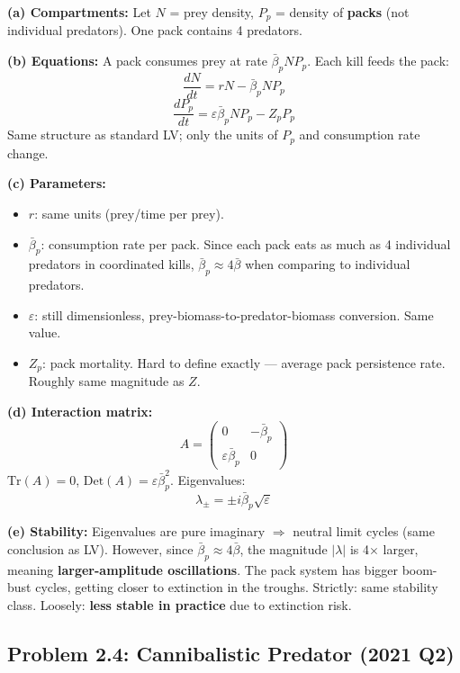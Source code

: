 \documentclass[10pt]{article}
\begin{document}
\begin{solution}
\textbf{(a) Compartments:} Let $N$ = prey density, $P_p$ = density of \textbf{packs} (not individual predators). One pack contains 4 predators.

\textbf{(b) Equations:} A pack consumes prey at rate $\bar\beta_p N P_p$. Each kill feeds the pack:
\[
\frac{dN}{dt} = rN - \bar\beta_p N P_p
\]
\[
\frac{dP_p}{dt} = \varepsilon \bar\beta_p N P_p - Z_p P_p
\]
Same structure as standard LV; only the units of $P_p$ and consumption rate change.

\textbf{(c) Parameters:}
\begin{itemize}
\item $r$: same units (prey/time per prey).
\item $\bar\beta_p$: consumption rate per pack. Since each pack eats as much as 4 individual predators in coordinated kills, $\bar\beta_p \approx 4\bar\beta$ when comparing to individual predators.
\item $\varepsilon$: still dimensionless, prey-biomass-to-predator-biomass conversion. Same value.
\item $Z_p$: pack mortality. Hard to define exactly — average pack persistence rate. Roughly same magnitude as $Z$.
\end{itemize}

\textbf{(d) Interaction matrix:}
\[
A = \begin{pmatrix} 0 & -\bar\beta_p \\ \varepsilon\bar\beta_p & 0 \end{pmatrix}
\]
$\text{Tr}(A) = 0$, $\text{Det}(A) = \varepsilon\bar\beta_p^2$. Eigenvalues:
\[
\lambda_\pm = \pm i\bar\beta_p \sqrt{\varepsilon}
\]

\textbf{(e) Stability:} Eigenvalues are pure imaginary $\Rightarrow$ neutral limit cycles (same conclusion as LV). However, since $\bar\beta_p \approx 4\bar\beta$, the magnitude $|\lambda|$ is 4$\times$ larger, meaning \textbf{larger-amplitude oscillations}. The pack system has bigger boom-bust cycles, getting closer to extinction in the troughs. Strictly: same stability class. Loosely: \textbf{less stable in practice} due to extinction risk.
\end{solution}

\subsection{Problem 2.4: Cannibalistic Predator (2021 Q2)}
\end{document}
